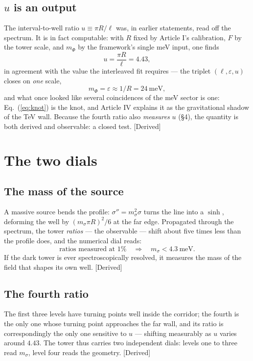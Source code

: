 \subsection{$u$ is an output}
The interval-to-well ratio $u\equiv\pi R/\ell$ was, in earlier statements, read off the spectrum. It is in fact computable: with $R$ fixed by Article I's calibration, $F$ by the tower scale, and $m_{\Phi}$ by the framework's single meV input, one finds
\begin{equation}
u=\frac{\pi R}{\ell}=4.43 ,
\end{equation}
in agreement with the value the interleaved fit requires --- the triplet $(\ell,\varepsilon,u)$ closes on \emph{one} scale,
\begin{equation}
m_{\Phi}=\varepsilon\approx 1/R=24~\mathrm{meV},
\label{eq:knot}
\end{equation}
and what once looked like several coincidences of the meV sector is one: Eq.~(\ref{eq:knot}) is the knot, and Article IV explains it as the gravitational shadow of the TeV wall. Because the fourth ratio also \emph{measures} $u$ (\S4), the quantity is both derived and observable: a closed test. [Derived]

\section{The two dials}
\subsection{The mass of the source}
A massive source bends the profile: $\sigma''=m_{\sigma}^{2}\sigma$ turns the line into a $\sinh$, deforming the well by $(m_{\sigma}\pi R)^{2}/6$ at the far edge. Propagated through the spectrum, the tower \emph{ratios} --- the observable --- shift about five times less than the profile does, and the numerical dial reads:
\begin{equation}
\text{ratios measured at }1\%\quad\Longrightarrow\quad m_{\sigma}<4.3~\mathrm{meV}.
\end{equation}
If the dark tower is ever spectroscopically resolved, it measures the mass of the field that shapes its own well. [Derived]
\subsection{The fourth ratio}
The first three levels have turning points well inside the corridor; the fourth is the only one whose turning point approaches the far wall, and its ratio is correspondingly the only one sensitive to $u$ --- shifting measurably as $u$ varies around $4.43$. The tower thus carries two independent dials: levels one to three read $m_{\sigma}$, level four reads the geometry. [Derived]

